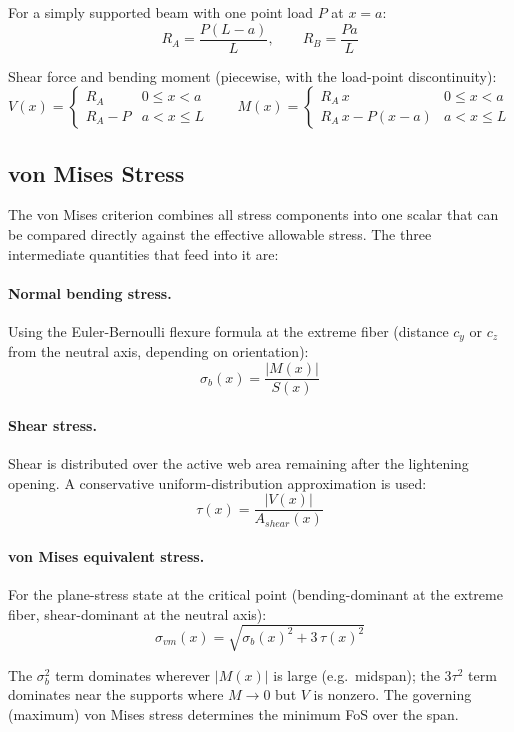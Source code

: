 \documentclass[11pt,letterpaper]{article}
\begin{document}
For a simply supported beam with one point load $P$ at $x = a$:
\[
  R_A = \frac{P(L-a)}{L}, \qquad R_B = \frac{Pa}{L}
\]

Shear force and bending moment (piecewise, with the load-point discontinuity):
\[
  V(x) = \begin{cases} R_A & 0 \le x < a \\ R_A - P & a < x \le L \end{cases}
  \qquad
  M(x) = \begin{cases} R_A\,x & 0 \le x < a \\ R_A\,x - P(x-a) & a < x \le L \end{cases}
\]

\subsection{von Mises Stress}

The von Mises criterion combines all stress components into one scalar that
can be compared directly against the effective allowable stress.  The three
intermediate quantities that feed into it are:

\paragraph{Normal bending stress.}
Using the Euler-Bernoulli flexure formula at the extreme fiber
(distance $c_y$ or $c_z$ from the neutral axis, depending on orientation):
\[
  \sigma_b(x) = \frac{|M(x)|}{S(x)}
\]

\paragraph{Shear stress.}
Shear is distributed over the active web area remaining after the lightening
opening.  A conservative uniform-distribution approximation is used:
\[
  \tau(x) = \frac{|V(x)|}{A_{shear}(x)}
\]

\paragraph{von Mises equivalent stress.}
For the plane-stress state at the critical point (bending-dominant at the
extreme fiber, shear-dominant at the neutral axis):
\[
  \sigma_{vm}(x) = \sqrt{\sigma_b(x)^2 + 3\,\tau(x)^2}
\]

The $\sigma_b^2$ term dominates wherever $|M(x)|$ is large (e.g.\ midspan);
the $3\tau^2$ term dominates near the supports where $M \to 0$ but $V$ is
nonzero.  The governing (maximum) von Mises stress determines the minimum
FoS over the span.
\end{document}
